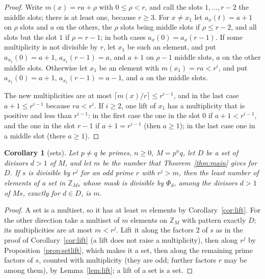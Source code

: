 \documentclass[11pt,a4paper]{amsart}
\newtheorem{corollary}[theorem]{Corollary}
\theoremstyle{definition}
\theoremstyle{remark}
\newcommand{\Z}{\mathbb{Z}}
\begin{document}
\begin{proof}
Write $m(x)=ra+\rho$ with $0\le\rho<r$, and call the slots $1,\dots,r-2$ the middle slots; there is at least one, because
$r\ge3$. For $x\ne x_1$ let $a_x(t)=a+1$ on $\rho$ slots and $a$ on the others, the $\rho$ slots being middle slots
if $\rho\le r-2$, and all slots but the slot $1$ if $\rho=r-1$; in both cases $a_x(0)=a_x(r-1)$. If some
multiplicity is not divisible by $r$, let $x_1$ be such an element, and put $a_{x_1}(0)=a+1$, $a_{x_1}(r-1)=a$,
and $a+1$ on $\rho-1$ middle slots, $a$ on the other middle slots. Otherwise let $x_1$ be an element with
$m(x_1)=ra<r^i$, and put $a_{x_1}(0)=a+1$, $a_{x_1}(r-1)=a-1$, and $a$ on the middle slots.

The new multiplicities are at most $\lceil m(x)/r\rceil\le r^{i-1}$, and in the last case $a+1\le r^{i-1}$ because
$ra<r^i$. If $i\ge2$, one lift of $x_1$ has a multiplicity that is positive and less than $r^{i-1}$: in the first
case the one in the slot $0$ if $a+1<r^{i-1}$, and the one in the slot $r-1$ if $a+1=r^{i-1}$ (then $a\ge1$); in
the last case one in a middle slot (there $a\ge1$).
\end{proof}

\begin{corollary}[sets]\label{cor:sets}
Let $p\ne q$ be primes, $n\ge0$, $M=p^nq$, let $D$ be a set of divisors $d>1$ of $M$, and let $m$ be the number
that Theorem~\ref{thm:main} gives for $D$. If $s$ is divisible by $r^j$ for an odd prime $r$ with $r^j>m$, then
the least number of elements of a \emph{set} in $\Z_{Ms}$ whose mask is divisible by $\Phi_d$, among the divisors
$d>1$ of $Ms$, exactly for $d\in D$, is $m$.
\end{corollary}
\begin{proof}
A set is a multiset, so it has at least $m$ elements by Corollary~\ref{cor:lift}. For the other direction take a
multiset of $m$ elements on $\Z_M$ with pattern exactly $D$; its multiplicities are at most $m<r^j$. Lift it along
the factors $2$ of $s$ as in the proof of Corollary~\ref{cor:lift} (a lift does not raise a multiplicity), then along
$r^j$ by Proposition~\ref{prop:setlift}, which makes it a set, then along the remaining prime factors of $s$, counted
with multiplicity (they are odd; further factors $r$ may be among them), by Lemma~\ref{lem:lift}; a lift of a set is a set.
\end{proof}
\end{document}
